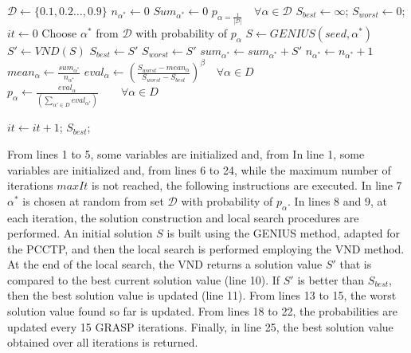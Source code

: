 \documentclass{ro}
\begin{document}
\begin{algorithm}[!h]
	\caption{\hspace{-1mm}:  R-GRASP($maxIt$, $seed$,  $\beta=10$)}
	\label{alg:grasp}
	{\footnotesize
		\begin{algorithmic}[1]	
		    \STATE $\mathcal{D} \gets \{0.1,0.2 \ldots ,0.9\}$ \hfill{}
		    \STATE $n_{\alpha^*} \gets 0$ \hfill {}
		    \STATE $Sum_{\alpha^*} \gets 0$ \hfill {}
		    \STATE $p_{\alpha=\frac{1}{|\mathcal{D}|}} \quad \forall \alpha \in \mathcal{D}$
			\STATE $S_{best} \gets \infty$; $S_{worst} \gets 0$; $it \gets 0$
		    \STATE Choose $\alpha^*$ from $\mathcal{D}$ with probability of $p_{\alpha}$
			\STATE $S \gets GENIUS(seed, \alpha^*)$ 
			\STATE $S' \gets VND(S)$
			\STATE $S_{best} \gets S'$
			\ENDIF
            \STATE $S_{worst} \gets S'$
            \ENDIF
            \STATE $sum_{\alpha^*} \gets sum_{\alpha^*} + S'$
			\STATE $n_{\alpha^*} \gets n_{\alpha^*} + 1$
            \STATE $mean_{\alpha} \gets \frac{sum_{\alpha^*}}{n_{\alpha^*}}$
            \STATE $eval_{\alpha} \gets \left( \frac{S_{worst} - mean_{\alpha}}{S_{worst} - S_{best}} \right)^\beta \quad \forall \alpha \in D$
            \STATE $p_{\alpha} \gets \frac{eval_{\alpha}}{\left( \sum_{\alpha' \in D} eval_{\alpha'}\right)}\qquad \forall \alpha \in D$
            \ENDIF
            
			\STATE $it \gets it + 1$;
			\ENDWHILE
			\RETURN $S_{best}$;
		\end{algorithmic}
	}
\end{algorithm}	

From lines 1 to 5, some variables are initialized and, from
In line 1, some variables are initialized and, from lines 6 to 24, while the maximum number of iterations $maxIt$ is not reached, the following instructions are executed. In line 7 $\alpha^*$ is chosen at random from set $\mathcal{D}$ with probability of $p_{\alpha}$.
In lines 8 and 9, at each iteration, the solution construction and local search procedures are performed. An initial   solution $S$ is built using the GENIUS method, adapted for the PCCTP, and then the local search is performed employing the VND method. At the end of the local search, the VND returns a  solution value $S'$ that is compared to the best current solution  value (line 10). If  $S'$  is better than $S_{best}$, then the best solution value is updated (line 11). From lines 13 to 15, the worst solution value found so far is updated. From lines 18 to 22,  the probabilities are updated every 15 GRASP iterations.
Finally, in line 25, the best solution value obtained over all iterations is returned.
\end{document}
